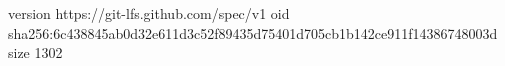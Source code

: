 version https://git-lfs.github.com/spec/v1
oid sha256:6c438845ab0d32e611d3c52f89435d75401d705cb1b142ce911f14386748003d
size 1302
